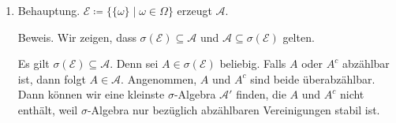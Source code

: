 \documentclass[draft,a5paper]{article}
\theoremstyle{remark}
\begin{document}
\begin{enumerate}
\item Behauptung.  \(\mathcal{E} \coloneq \{ \{\omega\} \mid \omega \in \Omega\}\) erzeugt \(\mathcal{A}\).

  Beweis.  Wir zeigen, dass \(\sigma(\mathcal{E}) \subseteq \mathcal{A}\) und \(\mathcal{A} \subseteq \sigma(\mathcal{E})\) gelten.

  Es gilt  \(\sigma(\mathcal{E}) \subseteq \mathcal{A}\).  Denn sei \(A \in \sigma(\mathcal{E})\) beliebig.  Falls \(A\) oder
  \(A^{c}\) abzählbar ist, dann folgt \(A \in \mathcal{A}\).  Angenommen, \(A\) und
  \(A^{c}\) sind beide überabzählbar.  Dann können wir eine kleinste
  \(\sigma\)-Algebra \(\mathcal{A}'\) finden, die \(A\) und \(A^{c}\) nicht enthält, weil
  \(\sigma\)-Algebra nur bezüglich abzählbaren Vereinigungen stabil ist.


\end{enumerate}
\end{document}
